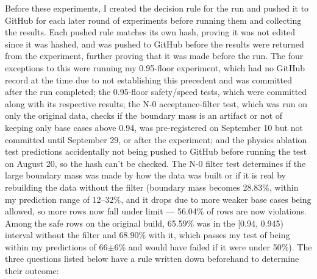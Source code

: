 \documentclass[12pt]{article}
\begin{document}
Before these experiments, I created the decision rule for the run and pushed it to GitHub for each later round of experiments before running them and collecting the results. Each pushed rule matches its own hash, proving it was not edited since it was hashed, and was pushed to GitHub before the results were returned from the experiment, further proving that it was made before the run. The four exceptions to this were running my 0.95-floor experiment, which had no GitHub record at the time due to not establishing this precedent and was committed after the run completed; the 0.95-floor safety/speed tests, which were committed along with its respective results; the N-0 acceptance-filter test, which was run on only the original data, checks if the boundary mass is an artifact or not of keeping only base cases above 0.94, was pre-registered on September 10 but not committed until September 29, or after the experiment; and the physics ablation test predictions accidentally not being pushed to GitHub before running the test on August 20, so the hash can’t be checked. The N-0 filter test determines if the large boundary mass was made by how the data was built or if it is real by rebuilding the data without the filter (boundary mass becomes 28.83\%, within my prediction range of 12--32\%, and it drops due to more weaker base cases being allowed, so more rows now fall under limit — 56.04\% of rows are now violations. Among the safe rows on the original build, 65.59\% was in the [0.94, 0.945) interval without the filter and 68.90\% with it, which passes my test of being within my predictions of 66$\pm$6\% and would have failed if it were under 50\%). The three questions listed below have a rule written down beforehand to determine their outcome:
\end{document}
